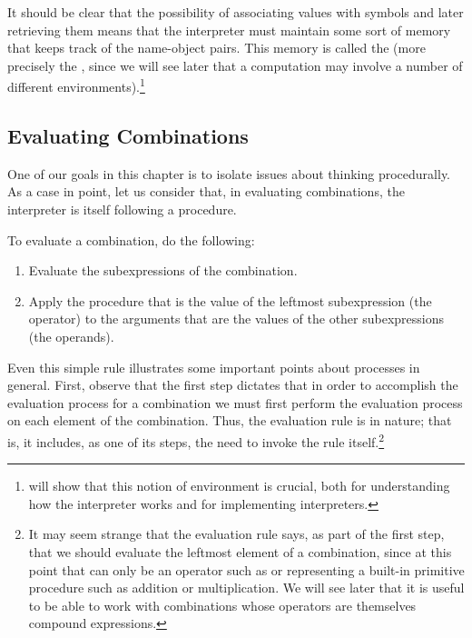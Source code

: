 It should be clear that the possibility of associating values with symbols and
later retrieving them means that the interpreter must maintain some sort of
memory that keeps track of the name-object pairs.  This memory is called the
 (more precisely the , since
we will see later that a computation may involve a number of different
environments).\footnote{ will show that this notion of
environment is crucial, both for understanding how the interpreter works and
for implementing interpreters.}

\subsection{Evaluating Combinations}
\label{Section 1.1.3}

One of our goals in this chapter is to isolate issues about thinking
procedurally.  As a case in point, let us consider that, in evaluating
combinations, the interpreter is itself following a procedure.

To evaluate a combination, do the following:

\begin{enumerate}

\item
Evaluate the subexpressions of the combination.

\item
Apply the procedure that is the value of the leftmost subexpression (the
operator) to the arguments that are the values of the other subexpressions (the
operands).

\end{enumerate}

\noindent
Even this simple rule illustrates some important points about processes in
general.  First, observe that the first step dictates that in order to
accomplish the evaluation process for a combination we must first perform the
evaluation process on each element of the combination.  Thus, the evaluation
rule is  in nature; that is, it includes, as one of its
steps, the need to invoke the rule itself.\footnote{It may seem strange that
the evaluation rule says, as part of the first step, that we should evaluate
the leftmost element of a combination, since at this point that can only be an
operator such as \code{+} or \code{*} representing a built-in primitive
procedure such as addition or multiplication.  We will see later that it is
useful to be able to work with combinations whose operators are themselves
compound expressions.}


